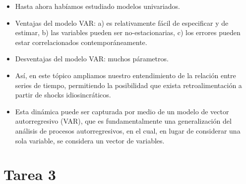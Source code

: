 	\begin{itemize}
		\item Hasta ahora hab\'{i}amos estudiado modelos univariados.
		\item Ventajas del modelo VAR: a) es relativamente f\'acil de especificar y de estimar, b) las variables pueden ser no-estacionarias, c) los errores pueden estar correlacionados contempor\'aneamente.
		\item Desventajas del modelo VAR: muchos p\'arametros.
		\item Así, en este t\'opico ampliamos nuestro entendimiento de la relaci\'on entre series de tiempo, permitiendo la posibilidad que exista retroalimentación a partir de shocks idiosincr\'aticos. 
		\item Esta din\'amica puede ser capturada por medio de un modelo de vector autorregresivo (VAR), que es fundamentalmente una generalizaci\'on del an\'alisis de procesos autorregresivos, en el cual, en lugar de considerar una sola variable, se considera un vector de variables.
	\end{itemize}



%	
%	
	
\pagebreak
\section{Tarea 3}

